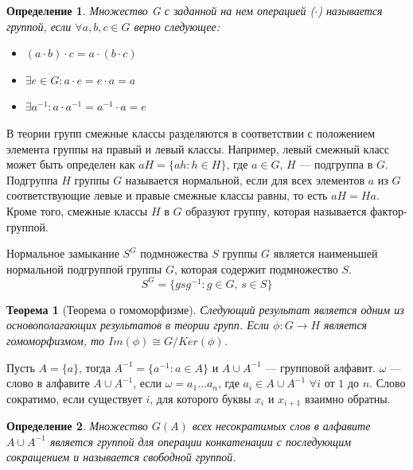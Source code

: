 \documentclass[14pt]{matmex-diploma-custom}
\newtheorem{thm}{Теорема}[subsection]
\newtheorem{defn}{Определение}[subsection]
\begin{document}
\begin{defn}
Множество G с заданной на нем операцией ($ \cdot $) называется группой, если $ \forall a, b, c \in G $
верно следующее:
\begin{itemize}
\item $(a \cdot b) \cdot c = a \cdot (b \cdot c)$
\item $\exists e \in G : a \cdot e = e \cdot a = a$
\item $\exists a^{-1} : a \cdot a^{-1} = a^{-1} \cdot a = e$
\end{itemize}
\end{defn}

В теории групп смежные классы разделяются в соответствии с положением элемента группы
на правый и левый классы. 
Например, левый смежный класс может быть определен как $aH = \{ah: h \in H \}$,
где $ a \in G $, $ H $ --- подгруппа в $G$.
Подгруппа $ H $ группы $ G $ называется нормальной, если для всех
элементов $ a $ из $ G $ соответствующие левые и правые смежные классы равны,
то есть $ aH = Ha $. Кроме того, смежные классы $ H $ в $ G $ образуют группу, которая
называется фактор-группой.

Нормальное замыкание $ S^G $ подмножества $ S $ группы $ G $ является наименьшей нормальной подгруппой
группы $ G $, которая содержит подмножество $ S $.
\begin{equation}
    S^G = \{ gsg^{-1} : g \in G,\, s \in S \}
\end{equation}

\begin{thm}[Теорема о гомоморфизме] \label{gomomorphThm}
Следующий результат является одним из основополагающих результатов в теории групп.
Если $ \phi: G \to H $ является гомоморфизмом, то $ Im (\phi) \cong G/Ker (\phi) $.
\end{thm}

Пусть $ A = \{a\} $, тогда $ A^{-1} = \{a^{-1}: a \in A\} $ и $ A \cup A^{-1} $ --- групповой алфавит.
$ \omega $ --- слово в алфавите $ A \cup A^{-1} $, если $\omega = a_1 \dots a_n$,
где $ a_i \in A \cup A^{-1}$ $\forall i$ от $1$ до $n$.
Слово сократимо, если существует $ i $, для которого буквы $ x_i $ и $ x_{i + 1} $ взаимно обратны.

\begin{defn}
Множество $ G (A) $ всех несократимых слов в алфавите $ A \cup A^{-1} $
является группой для операции конкатенации с последующим сокращением и называется свободной группой.
\end{defn}
\end{document}
